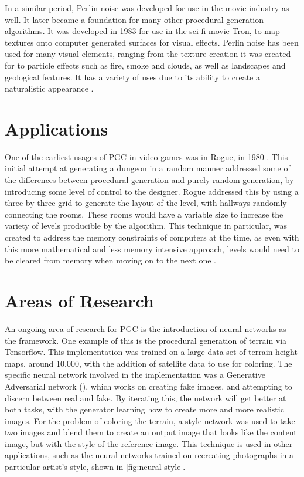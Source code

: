 \documentclass[10pt]{report}
\begin{document}
		In a similar period, Perlin noise was developed for use in the movie industry as well. It later became a foundation for many other procedural generation algorithms. It was developed in 1983 for use in the sci-fi movie Tron, to map textures onto computer generated surfaces for visual effects. Perlin noise has been used for many visual elements, ranging from the texture creation it was created for to particle effects such as fire, smoke and clouds, as well as landscapes and geological features. It has a variety of uses due to its ability to create a naturalistic appearance \cite{10.1145/325165.325247}.
		
		\section{Applications}
		One of the earliest usages of PGC in video games was in Rogue, in 1980 \cite{rogue}. This initial attempt at generating a dungeon in a random manner addressed some of the differences between procedural generation and purely random generation, by introducing some level of control to the designer. Rogue addressed this by using a three by three grid to generate the layout of the level, with hallways randomly connecting the rooms. These rooms would have a variable size to increase the variety of levels producible by the algorithm. This technique in particular, was created to address the memory constraints of computers at the time, as even with this more mathematical and less memory intensive approach, levels would need to be cleared from memory when moving on to the next one \cite{rogue}.
		

		\section{Areas of Research}
	
		An ongoing area of research for PGC is the introduction of neural networks as the framework. One example of this is the procedural generation of terrain via Tensorflow. This implementation was trained on a large data-set of terrain height maps, around 10,000, with the addition of satellite data to use for coloring. The specific neural network involved in the implementation was a Generative Adversarial network (\cite[see]{goodfellow2014generative}), which works on creating fake images, and attempting to discern between real and fake. By iterating this, the network will get better at both tasks, with the generator learning how to create more and more realistic images. For the problem of coloring the terrain, a style network was used to take two images and blend them to create an output image that looks like the content image, but with the style of the reference image. This technique is used in other applications, such as the neural networks trained on recreating photographs in a particular artist's style, shown in \autoref{fig:neural-style}. 
		
\end{document}
